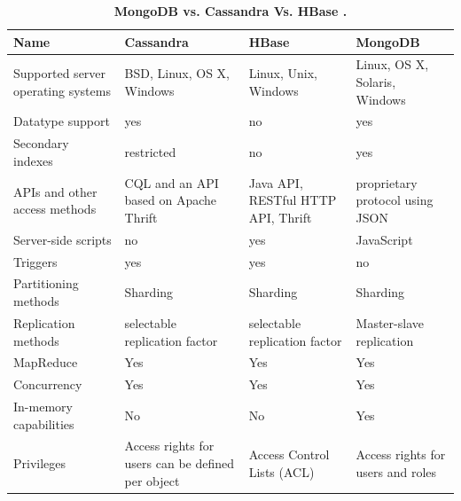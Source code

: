 \documentclass[9pt,twocolumn,twoside]{../../styles/osajnl}
\begin{document}
\begin{table}[htbp]
\begin{center}
\caption{\bf MongoDB vs. Cassandra Vs. HBase \cite{www-mongo10}.}
\begin{tabular}{ m{5em} m{2cm} m{2cm} m{2cm} } 
\hline
Name & Cassandra & HBase & MongoDB \\ 
\hline
Supported server operating systems & BSD, Linux, OS X, Windows &
Linux, Unix, Windows & Linux, OS X, Solaris, Windows \\

Datatype support & yes & no & yes \\

Secondary indexes & restricted & no & yes \\

APIs and other access methods & CQL and an API based on Apache Thrift
& Java API, RESTful HTTP API, Thrift & proprietary protocol using JSON
\\

Server-side scripts & no & yes & JavaScript \\

Triggers & yes & yes & no \\

Partitioning methods & Sharding & Sharding & Sharding \\

Replication methods & selectable replication factor & selectable
replication factor & Master-slave replication \\

MapReduce & Yes & Yes & Yes \\ 

Concurrency & Yes & Yes & Yes \\

In-memory capabilities & No & No & Yes \\ 

Privileges & Access rights for users can be defined per object &
Access Control Lists (ACL) & Access rights for users and roles \\

\hline
\end{tabular}
  \label{tab:DB compare}
\end{center}
\end{table} 



\end{document}
